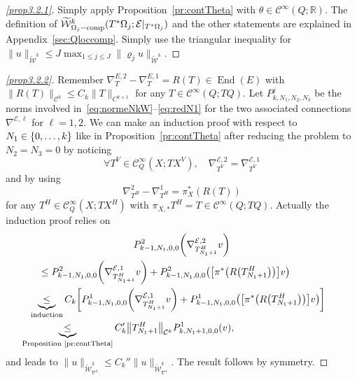 \documentclass[AHL,Unicode,longabstracts]{cedram}
\newcommand{\R}{\mathbb{R}}
\newcommand{\clW}{\mathcal{W}}
\newcommand{\clC}{\mathcal{C}}
\newcommand{\clE}{\mathcal{E}}
\DeclareMathOperator{\End}{End}
\DeclareMathOperator{\ccomp}{comp}
\let\oldtilde\tilde
\renewcommand*{\tilde}[1]{\mathchoice{\widetilde{#1}}{\widetilde{#1}}{\oldtilde{#1}}{\oldtilde{#1}}}
\let\oldforall\forall
\renewcommand*{\forall}{\mathrel{\oldforall}}
\let\originalleft\left
\let\originalright\right
\renewcommand{\left}{\mathopen{}\mathclose\bgroup\originalleft}
\renewcommand{\right}{\aftergroup\egroup\originalright}
\begin{document}
\begin{proofc}
\begin{proof}[{\eqref{prop3.2.1}}]
Simply apply Proposition~\ref{pr:contTheta} with $\theta\in \clC^{\infty}(Q;\R)$. The definition of $\tilde{\clW}^{k}_{\Omega_{j}-\ccomp}(T^{*}\Omega_{j};\clE|_{T^{*}\Omega_{j}})$ and the other statements are explained in Appendix~\ref{sec:Qloccomp}. Simply use the triangular inequality for $\|u\|_{\widetilde{\clW}^{k}}\leq J\max_{1\leq j\leq J}\|\varrho_{j}u\|_{\widetilde{\clW}^{k}}$.
\let\qed\relax
\end{proof}
\begin{proof}[{\eqref{prop3.2.2}}]
Remember $\nabla_{T}^{E,2}-\nabla_{T}^{E,1}=R(T)\in \End(E)$ with $\|R(T)\|_{\clC^{k}}\leq C_{k}\|T\|_{C^{k+1}}$ for any $T\in \clC^{\infty}(Q;TQ)$. Let $P_{k,N_{1},N_{2},N_{3}}^{j}$ be the norms involved in~\eqref{eq:normeNkW}--\eqref{eq:redN1} for the two associated connections $\nabla^{\clE,\ell}$ for $\ell=1,2$. We can make an induction proof with respect to $N_{1}\in \left\{0,\dots,k\right\}$ like in Proposition~\ref{pr:contTheta} after reducing the problem to $N_{2}=N_{3}=0$ by noticing
\[
\forall T^{V}\in \clC^{\infty}_{Q}(X;TX^{V}),\quad
\nabla_{T^{V}}^{\clE,2}=\nabla_{T^{V}}^{\clE,1}
\]
and by using
\[
\nabla_{T^{H}}^{2}-\nabla_{T^{H}}^{1}=\pi_{X}^{*}(R(T))
\]
for any $T^{H}\in \clC^{\infty}_{Q}(X;TX^{H})$ with $\pi_{X,*}T^{H}=T\in \clC^{\infty}(Q;TQ)$.
Actually the induction proof relies on
\begin{multline*}
P^{2}_{k-1,N_{1},0,0}\left(\nabla_{T_{N_{1}+1}^{H}}^{\clE,2}v\right)\\
\begin{aligned}
&\leq P^{2}_{k-1,N_{1},0,0}\left(\nabla_{T_{N_{1}+1}^{H}}^{\clE,1}v\right)+ P^{2}_{k-1,N_{1},0,0}\left(\left[\pi^{*}\left(R\left(T_{N_{1}+1}^{H}\right)\right)\right]v\right)\\
&\mkern-17mu\underbrace{\leq}_{\text{induction}}C_{k}\left[P^{1}_{k-1,N_{1},0,0}\left(\nabla_{T_{N_{1}+1}^{H}}^{\clE,1}v\right)+ P^{1}_{k-1,N_{1},0,0}\left(\left[\pi^{*}\left(R\left(T_{N_{1}+1}^{H}\right)\right)\right]v\right)\right]\\
&\mkern-33mu\underbrace{\leq}_{\text{Proposition~\ref{pr:contTheta}}} C_{k}'\left\|T_{N_{1}+1}^{H}\right\|_{\clC^{k}} P^{1}_{k,N_{1}+1,0,0}(v),
\end{aligned}
\end{multline*}
and leads to $\|u\|_{\widetilde{\clW}^{k}_{\nabla^{2}}}\leq C_{k}''\|u\|_{\widetilde{\clW}^{k}_{\nabla^{1}}}$. The result follows by symmetry.
\end{proof}
\let\qed\relax
\end{proofc}
\end{document}
